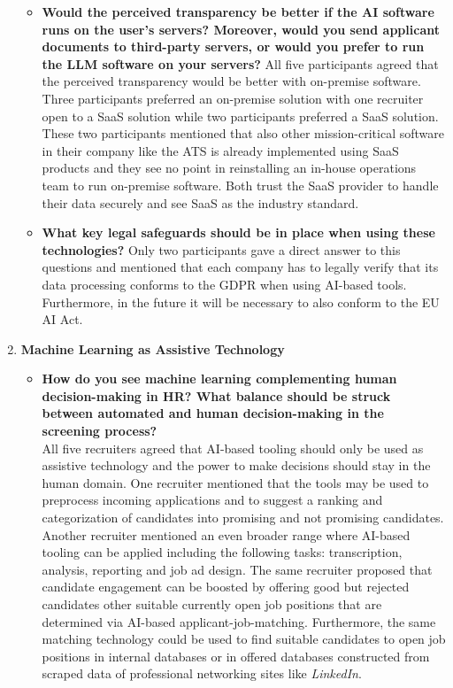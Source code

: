 \documentclass[draft,final]{thesisclass} %
\begin{document}
\begin{enumerate}
\begin{itemize}
        \item \textbf{Would the perceived transparency be better if the \acs{AI} software runs on the user's servers? Moreover, would you send applicant documents to third-party servers, or would you prefer to run the \acs{LLM} software on your servers?}
        All five participants agreed that the perceived transparency would be better with on-premise software. 
        Three participants preferred an on-premise solution with one recruiter open to a \acs{SaaS} solution while two participants preferred a \acs{SaaS} solution. 
        These two participants mentioned that also other mission-critical software in their company like the \acs{ATS} is already implemented using \acs{SaaS} products and they see no point in reinstalling an in-house operations team to run on-premise software.
        Both trust the \acs{SaaS} provider to handle their data securely and see \acs{SaaS} as the industry standard.
        \item \textbf{What key legal safeguards should be in place when using these technologies?}
        Only two participants gave a direct answer to this questions and mentioned that each company has to legally verify that its data processing conforms to the \acs{GDPR} when using \acs{AI}-based tools. Furthermore, in the future it will be necessary to also conform to the \acs{EU AI Act}.
    \end{itemize}
    \item \textbf{Machine Learning as Assistive Technology}
    \begin{itemize}
        \item \textbf{How do you see machine learning complementing human decision-making in \acs{HR}? What balance should be struck between automated and human decision-making in the screening process?}\\
        All five recruiters agreed that \acs{AI}-based tooling should only be used as assistive technology and the power to make decisions should stay in the human domain. One recruiter mentioned that the tools may be used to preprocess incoming applications and to suggest a ranking and categorization of candidates into promising and not promising candidates. Another recruiter mentioned an even broader range where \acs{AI}-based tooling can be applied including the following tasks: transcription, analysis, reporting and job ad design. The same recruiter proposed that candidate engagement can be boosted by offering good but rejected candidates other suitable currently open job positions that are determined via \acs{AI}-based applicant-job-matching. Furthermore, the same matching technology could be used to find suitable candidates to open job positions in internal databases or in offered databases constructed from scraped data of professional networking sites like \textit{LinkedIn}.

\end{itemize}
\end{enumerate}
\end{document}
